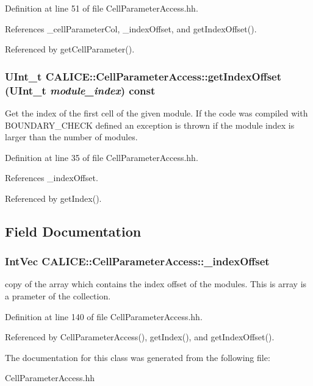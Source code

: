 Definition at line 51 of file CellParameterAccess.hh.

References \_\-cellParameterCol, \_\-indexOffset, and getIndexOffset().

Referenced by getCellParameter().
\subsubsection[{getIndexOffset}]{\setlength{\rightskip}{0pt plus 5cm}UInt\_\-t CALICE::CellParameterAccess::getIndexOffset (UInt\_\-t {\em module\_\-index}) const\hspace{0.3cm}{\ttfamily  [inline]}}\label{classCALICE_1_1CellParameterAccess_aeb83b00cd1c6686c1d0ee49c68fe4aec}


Get the index of the first cell of the given module. If the code was compiled with BOUNDARY\_\-CHECK defined an exception is thrown if the module index is larger than the number of modules. 

Definition at line 35 of file CellParameterAccess.hh.

References \_\-indexOffset.

Referenced by getIndex().

\subsection{Field Documentation}
\subsubsection[{\_\-indexOffset}]{\setlength{\rightskip}{0pt plus 5cm}IntVec {\bf CALICE::CellParameterAccess::\_\-indexOffset}\hspace{0.3cm}{\ttfamily  [private]}}\label{classCALICE_1_1CellParameterAccess_a273746ae202d398634e94e9fe7520128}


copy of the array which contains the index offset of the modules. This is array is a prameter of the collection. 

Definition at line 140 of file CellParameterAccess.hh.

Referenced by CellParameterAccess(), getIndex(), and getIndexOffset().

The documentation for this class was generated from the following file:\begin{DoxyCompactItemize}
\item 
CellParameterAccess.hh\end{DoxyCompactItemize}
